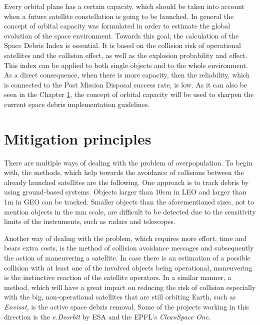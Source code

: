 Every orbital plane has a certain capacity, which should be taken into account when a future satellite constellation is going to be launched. In general the concept of orbital capacity was formulated in order to estimate the global evolution of the space environment. Towards this goal, the calculation of the Space Debris Index is essential. It is based on the collision risk of operational satellites and the collision effect, as well as the explosion probability and effect. This index can be applied to both single objects and to the whole environment. As a direct consequence, when there is more capacity, then the reliability, which is connected to the Post Mission Disposal success rate, is low. As it can also be seen in the Chapter \ref{chap:mitigation}, the concept of orbital capacity will be used to sharpen the current space debris implementation guidelines. \cite{Letizia 2019}


\bigskip
\section{Mitigation principles}
\label{chap:mitigation}
\bigskip

There are multiple ways of dealing with the problem of overpopulation. %
To begin with, the methods, which help towards the avoidance of collisions between the already launched satellites are the following. One approach is to track debris by using ground-based systems. Objects larger than 10cm in LEO and larger than 1m in GEO can be tracked. \cite{Kramer 2002} Smaller objects than the aforementioned sizes, not to mention objects in the mm scale, are difficult to be detected due to the sensitivity limits of the instruments, such as radars and telescopes.

Another way of dealing with the problem, which requires more effort, time and bears extra costs, is the method of collision avoidance messages and subsequently the action of maneuvering a satellite. In case there is an estimation of a possible collision with at least one of the involved objects being operational, maneuvering is the instinctive reaction of the satellite operators. In a similar manner, a method, which will have a great impact on reducing the risk of collision especially with the big, non-operational satellites that are still orbiting Earth, such as \textit{Envisat}, is the active space debris removal. Some of the projects working in this direction is the \textit{e.Deorbit} by ESA and the EPFL's \textit{CleanSpace One}.

